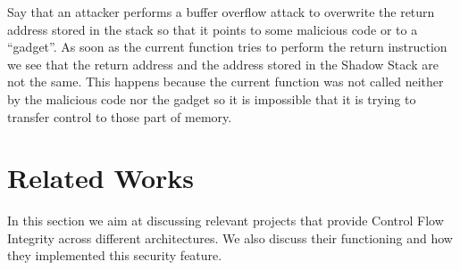 Say that an attacker performs a buffer overflow attack to overwrite the return
address stored in the stack so that it points to some malicious code or to a ``gadget''.
As soon as the current function tries to perform the return instruction we see that
the return address and the address stored in the Shadow Stack are not the same.
This happens because the current function was not called neither by the
malicious code nor the gadget so it is impossible that it is trying to transfer
control to those part of memory.

\section{Related Works}
\label{sec:background_related}

In this section we aim at discussing relevant projects that provide Control Flow
Integrity across different architectures. We also discuss their functioning and
how they implemented this security feature.